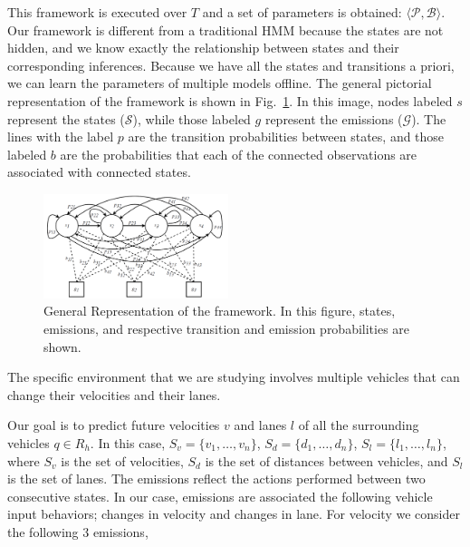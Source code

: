 \documentclass[letterpaper, 10 pt, conference]{ieeeconf}  %
\newcommand\NB[1]{$\spadesuit$\footnote{NB: #1}}
\newcommand\RP[1]{$\clubsuit$\footnote{RP: #1}}
\begin{document}
This framework is executed over $T$ and a set of parameters is obtained: $\langle \mathcal{P}, \mathcal{B} \rangle$. Our framework is different from a traditional HMM because the states are not hidden, and we know exactly the relationship %
between states and their corresponding inferences. Because we have all the states and transitions a priori, we can learn the parameters of multiple models offline. %
The general pictorial representation of the framework is shown in Fig.~\ref{fig:hmm}. %
In this image, nodes labeled $s$ represent the states ($\mathcal{S}$), while those labeled $g$ represent the emissions ($\mathcal{G}$). The lines with the label $p$ are the transition probabilities between states, and those labeled $b$ are the probabilities that each of the connected observations are associated with connected states.
\begin{figure}[h]
    \includegraphics[width=0.48\textwidth]{fig/hmm.png}
    \caption{General Representation of the framework. In this figure, states, emissions, and respective transition and emission probabilities are shown.}
    \label{fig:hmm}
\end{figure}

The specific environment that we are studying involves multiple vehicles that can change their velocities and their lanes.%

Our goal is to predict future velocities $v$ and lanes $l$ of all the surrounding vehicles $q\in R_h$. In this case, $S_v = \{v_1,\ldots, v_n\}$, $S_d = \{d_1,\ldots,d_n\}$, $S_l = \{l_1,\ldots,l_n\}$, where $S_v$ is the set of velocities, $S_d$ is the set of distances between vehicles, and $S_l$ is the set of lanes. The emissions reflect the actions performed between two consecutive states. In our case, emissions are associated the following vehicle input behaviors; changes in velocity and changes in lane. %
For velocity we consider the following 3 emissions,
    
\end{document}
